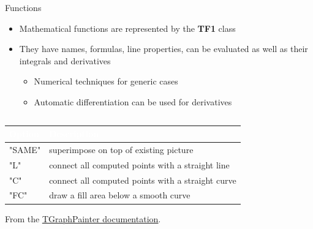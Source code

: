 \documentclass[aspectratio=169]{beamer}
\newcommand{\myhref}[2]{{\color{blue}\href{#1}{\underline{#2}}}}
\begin{document}
\begin{frame}{Functions}

\begin{itemize}
    \item{Mathematical functions are represented by the \textbf{TF1} class}
    \item{They have names, formulas, line properties, can be evaluated as well as their integrals and derivatives}
    \begin{itemize}
        \item{Numerical techniques for generic cases}
        \item{Automatic differentiation can be used for derivatives}
    \end{itemize}
\end{itemize}

\begin{columns}
    \begin{column}{0.6\textwidth}
        \vspace{0.5cm}
\begin{center}
    {\footnotesize
    \begin{tabular}{ |l|p{5.0cm}| }
 \hline
        \rowcolor{myblue} \textbf{\textcolor{white}{Option}} & \textbf{\textcolor{white}{Description}} \\
 \hline
 "SAME" & superimpose on top of existing picture \\
 \hline
 "L" & connect all computed points with a straight line \\
 \hline
 "C" & connect all computed points with a straight curve \\
 \hline
 "FC" & draw a fill area below a smooth curve \\
 \hline
\end{tabular}
    }
\end{center}
\begin{center}
    {\footnotesize From the \myhref{https://root.cern.ch/doc/master/classTGraphPainter.html}{TGraphPainter documentation}.}
\end{center}
\end{column}

    \begin{column}{0.4\textwidth}

\end{column}
\end{columns}
\end{frame}
\end{document}
